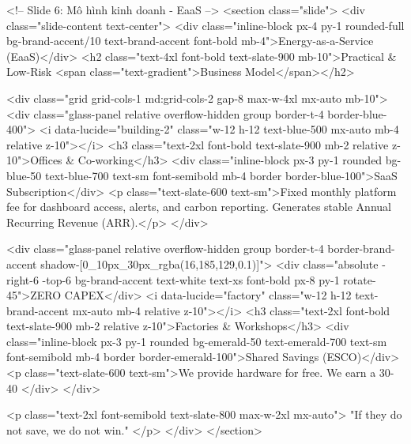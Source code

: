         <!-- Slide 6: Mô hình kinh doanh - EaaS -->
        <section class="slide">
            <div class="slide-content text-center">
                <div class="inline-block px-4 py-1 rounded-full bg-brand-accent/10 text-brand-accent font-bold mb-4">Energy-as-a-Service (EaaS)</div>
                <h2 class="text-4xl font-bold text-slate-900 mb-10">Practical & Low-Risk <span class="text-gradient">Business Model</span></h2>
                
                <div class="grid grid-cols-1 md:grid-cols-2 gap-8 max-w-4xl mx-auto mb-10">
                    <div class="glass-panel relative overflow-hidden group border-t-4 border-blue-400">
                        <i data-lucide="building-2" class="w-12 h-12 text-blue-500 mx-auto mb-4 relative z-10"></i>
                        <h3 class="text-2xl font-bold text-slate-900 mb-2 relative z-10">Offices & Co-working</h3>
                        <div class="inline-block px-3 py-1 rounded bg-blue-50 text-blue-700 text-sm font-semibold mb-4 border border-blue-100">SaaS Subscription</div>
                        <p class="text-slate-600 text-sm">Fixed monthly platform fee for dashboard access, alerts, and carbon reporting. Generates stable Annual Recurring Revenue (ARR).</p>
                    </div>
                    
                    <div class="glass-panel relative overflow-hidden group border-t-4 border-brand-accent shadow-[0_10px_30px_rgba(16,185,129,0.1)]">
                        <div class="absolute -right-6 -top-6 bg-brand-accent text-white text-xs font-bold px-8 py-1 rotate-45">ZERO CAPEX</div>
                        <i data-lucide="factory" class="w-12 h-12 text-brand-accent mx-auto mb-4 relative z-10"></i>
                        <h3 class="text-2xl font-bold text-slate-900 mb-2 relative z-10">Factories & Workshops</h3>
                        <div class="inline-block px-3 py-1 rounded bg-emerald-50 text-emerald-700 text-sm font-semibold mb-4 border border-emerald-100">Shared Savings (ESCO)</div>
                        <p class="text-slate-600 text-sm">We provide hardware for free. We earn a 30-40%
                    </div>
                </div>
                
                <p class="text-2xl font-semibold text-slate-800 max-w-2xl mx-auto">
                    "If they do not save, we do not win."
                </p>
            </div>
        </section>

